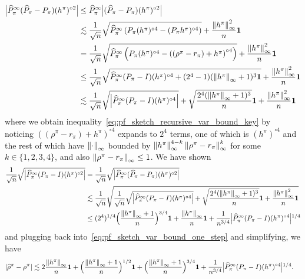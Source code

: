 \documentclass{article}
\theoremstyle{plain}
\theoremstyle{plain}
\theoremstyle{remark}
\theoremstyle{plain}
\theoremstyle{plain}
\newcommand{\Phat}{\widehat{P}}
\newcommand{\one}{\mathbf{1}}
\newcommand{\rhohat}{\widehat{\rho}}
\newcommand\cig[1]{\scalerel*[5.5pt]{\Big#1}{%
  \ensurestackMath{\addstackgap[1.5pt]{\big#1}}}}
\begin{document}
\begin{align}
    \cig|\Phat^\infty_\pi (\Phat_\pi - P_\pi) (h^\pi)^{\circ 2} \cig| &\leq \Phat^\infty_\pi \cig|( \Phat_\pi  - P_\pi) (h^\pi)^{\circ 2} \cig| \nonumber \\
    & \lesssim \frac{1}{\sqrt{n}}\sqrt{\Phat^\infty_\pi \left(P_\pi (h^\pi)^{\circ 4} - (P_\pi h^\pi)^{\circ 4} \right) } + \frac{\infnorm{h^\pi}^2}{n}\one \nonumber \\
    & = \frac{1}{\sqrt{n}}\sqrt{\Phat^\infty_\pi \left(P_\pi (h^\pi)^{\circ 4} - \left( (\rho^\pi - r_\pi) + h^\pi\right)^{\circ 4} \right) } + \frac{\infnorm{h^\pi}^2}{n}\one  \nonumber \\
    & \leq \frac{1}{\sqrt{n}}\sqrt{\Phat^\infty_\pi (P_\pi - I) (h^\pi)^{\circ 4} + (2^4 - 1) (\infnorm{h^\pi}+1)^{3}\one } + \frac{\infnorm{h^\pi}^2}{n}\one \label{eq:pf_sketch_recursive_var_bound_key} \\
    & \lesssim \frac{1}{\sqrt{n}}\sqrt{\left|\Phat^\infty_\pi (P_\pi - I) (h^\pi)^{\circ 4} \right|} + \sqrt{\frac{2^4 (\infnorm{h^\pi}+1)^{3}}{n}} \one + \frac{\infnorm{h^\pi}^2}{n}\one \nonumber
\end{align}
where we obtain inequality~\eqref{eq:pf_sketch_recursive_var_bound_key} by noticing $\left( (\rho^\pi - r_\pi) + h^\pi\right)^{\circ 4}$ expands to $2^4$ terms, one of which is $(h^\pi)^{\circ 4}$ and the rest of which have $\left\Vert \cdot\right\Vert _{\infty}$ bounded by $\left\Vert h^\pi\right\Vert _{\infty}^{4-k} \left\Vert \rho^\pi - r_\pi\right\Vert _{\infty}^{k}$ for some $k \in \{1,2,3,4\}$, and also $\left\Vert \rho^\pi - r_\pi\right\Vert _{\infty} \leq 1$. We have shown
\begin{align*}
    \frac{1}{\sqrt{n}} \sqrt{\cig|\Phat^\infty_\pi (P_\pi - I) (h^\pi)^{\circ 2} \cig|} & =  \frac{1}{\sqrt{n}} \sqrt{\cig|\Phat^\infty_\pi (\Phat_\pi - P_\pi) (h^\pi)^{\circ 2} \cig|} \\
    & \lesssim \frac{1}{\sqrt{n}} \sqrt{\frac{1}{\sqrt{n}}\sqrt{\cig|\Phat^\infty_\pi (P_\pi - I) (h^\pi)^{\circ 4} \cig|} + \sqrt{\frac{2^4 (\infnorm{h^\pi}+1)^{3}}{n}} \one + \frac{\infnorm{h^\pi}^2}{n}\one} \\
    & \leq (2^4)^{1/4} \Big(\frac{\infnorm{h^\pi}+ 1}{n} \Big)^{3/4} \one + \frac{\infnorm{h^\pi}}{n} \one + \frac{1}{n^{3/4}} \cig|\Phat^\infty_\pi (P_\pi - I) (h^\pi)^{\circ 4} \cig|^{1/4}
\end{align*}
and plugging back into~\eqref{eq:pf_sketch_var_bound_one_step} and simplifying, we have
\begin{align*}
    \left|\rhohat^\pi - \rho^\pi \right| & \lesssim 2\frac{\infnorm{h^\pi}}{n} \one + \Big(\frac{\infnorm{h^\pi}+1}{n}\Big)^{1/2} \one + \Big(\frac{\infnorm{h^\pi}+1}{n}\Big)^{3/4} \one + \frac{1}{n^{3/4}} \cig|\Phat^\infty_\pi (P_\pi - I) (h^\pi)^{\circ 4} \cig|^{1/4}.
\end{align*}
\end{document}
